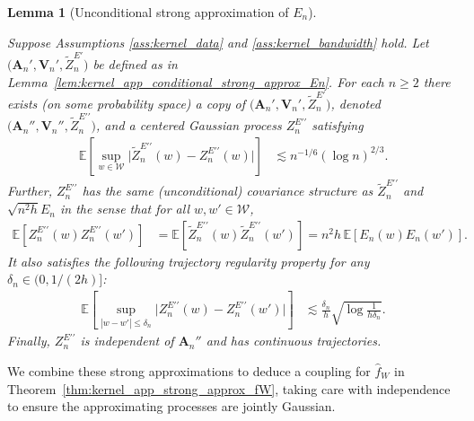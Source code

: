 \documentclass[11pt,lof]{puthesis}
\newcommand{\E}{\ensuremath{\mathbb{E}}}
\newcommand{\bA}{\ensuremath{\mathbf{A}}}
\newcommand{\bV}{\ensuremath{\mathbf{V}}}
\newcommand{\cW}{\ensuremath{\mathcal{W}}}
\newcommand{\dprime}{\ensuremath{\prime\prime}}
\theoremstyle{break}
\newtheorem{lemma}{Lemma}[section]
\theoremstyle{proof}
\begin{document}
\begin{lemma}[Unconditional strong approximation of $E_n$]
  \label{lem:kernel_app_unconditional_strong_approx_En}

  Suppose Assumptions
  \ref{ass:kernel_data} and \ref{ass:kernel_bandwidth} hold.
  Let $\big(\bA_n', \bV_n', \tilde Z_n^{E\prime}\big)$
  be defined as in
  Lemma~\ref{lem:kernel_app_conditional_strong_approx_En}.
  For each $n \geq 2$
  there exists
  (on some probability space)
  a copy of
  $\big(\bA_n', \bV_n', \tilde Z_n^{E\prime}\big)$,
  denoted $\big(\bA_n'', \bV_n'', \tilde Z_n^{E\dprime}\big)$, and a centered
  Gaussian process $Z^{E\dprime}_n$ satisfying
  \begin{align*}
    \E\left[
      \sup_{w \in \cW}
      \big|\tilde Z_n^{E\dprime}(w) - Z_n^{E\dprime}(w)\big|
    \right]
    &\lesssim
    n^{-1/6} (\log n)^{2/3}.
  \end{align*}
  Further,
  $Z_n^{E\dprime}$ has the same
  (unconditional) covariance structure as
  $\tilde Z_n^{E\dprime}$ and $\sqrt{n^2h} E_n$
  in the sense that for all $w, w' \in \cW$,
  \begin{align*}
    \E\left[
      Z_n^{E\dprime}(w)
      Z_n^{E\dprime}(w')
    \right]
    &=
    \E\left[
      \tilde Z_n^{E\dprime}(w)
      \tilde Z_n^{E\dprime}(w')
    \right]
    =
    n^2h \,
    \E\left[
      E_n(w)
      E_n(w')
    \right].
  \end{align*}
  It also satisfies the following
  trajectory regularity property
  for any $\delta_n \in (0, 1/(2h)]$:
  \begin{align*}
    \E\left[
      \sup_{|w-w'| \leq \delta_n}
      \big|
      Z_n^{E\dprime}(w)
      - Z_n^{E\dprime}(w')
      \big|
    \right]
    &\lesssim
    \frac{\delta_n}{h}
    \sqrt{\log \frac{1}{h\delta_n}}.
  \end{align*}
  Finally, $Z_n^{E\dprime}$ is independent of $\bA_n''$
  and has continuous trajectories.

\end{lemma}

We combine these strong approximations to deduce a coupling for $\hat f_W$ in
Theorem~\ref{thm:kernel_app_strong_approx_fW}, taking care with independence
to ensure the approximating processes are jointly Gaussian.
\end{document}
